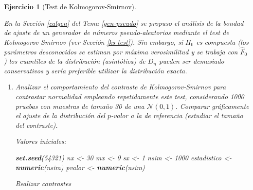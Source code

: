 \documentclass[
  spanish,
  10pt,
]{book}
\newenvironment{Shaded}{\begin{snugshade}}{\end{snugshade}}
\newcommand{\ControlFlowTok}[1]{\textcolor[rgb]{0.13,0.29,0.53}{\textbf{#1}}}
\newcommand{\DecValTok}[1]{\textcolor[rgb]{0.00,0.00,0.81}{#1}}
\newcommand{\FunctionTok}[1]{\textcolor[rgb]{0.13,0.29,0.53}{\textbf{#1}}}
\newcommand{\NormalTok}[1]{#1}
\newcommand{\OtherTok}[1]{\textcolor[rgb]{0.56,0.35,0.01}{#1}}
\newcommand{\SpecialCharTok}[1]{\textcolor[rgb]{0.81,0.36,0.00}{\textbf{#1}}}
\newcommand{\StringTok}[1]{\textcolor[rgb]{0.31,0.60,0.02}{#1}}
\theoremstyle{break}
\newtheorem{exercise}{Ejercicio}[chapter]
\theoremstyle{nonumberplain}
\begin{document}
\begin{exercise}[Test de Kolmogorov-Smirnov]
\protect\hypertarget{exr:ks-test-sim}{}\label{exr:ks-test-sim}

En la Sección \ref{calgen} del Tema \ref{gen-pseudo} se propuso el análisis de la bondad de ajuste de un generador de números pseudo-aleatorios mediante el test de Kolmogorov-Smirnov (ver Sección \ref{ks-test}).
Sin embargo, si \(H_{0}\) es compuesta (los parámetros desconocidos se estiman por máxima verosimilitud y se trabaja con \(\hat{F}_{0}\)) los cuantiles de la distribución (asintótica) de \(D_{n}\) pueden ser demasiado conservativos y sería preferible utilizar la distribución exacta.

\begin{enumerate}
\def\labelenumi{\alph{enumi})}
\item
  Analizar el comportamiento del contraste de Kolmogorov-Smirnov
  para contrastar normalidad empleando repetidamente este test,
  considerando 1000 pruebas con muestras de tamaño 30 de
  una \(\mathcal{N}(0,1)\). Comparar gráficamente el ajuste
  de la distribución del \(p\)-valor a la de referencia
  (estudiar el tamaño del contraste).

  Valores iniciales:

\begin{Shaded}
\begin{Highlighting}[]
\FunctionTok{set.seed}\NormalTok{(}\DecValTok{54321}\NormalTok{)}
\NormalTok{nx }\OtherTok{\textless{}{-}} \DecValTok{30}
\NormalTok{mx }\OtherTok{\textless{}{-}} \DecValTok{0}
\NormalTok{sx }\OtherTok{\textless{}{-}} \DecValTok{1}
\NormalTok{nsim }\OtherTok{\textless{}{-}} \DecValTok{1000}
\NormalTok{estadistico }\OtherTok{\textless{}{-}} \FunctionTok{numeric}\NormalTok{(nsim)}
\NormalTok{pvalor }\OtherTok{\textless{}{-}} \FunctionTok{numeric}\NormalTok{(nsim)}
\end{Highlighting}
\end{Shaded}

  Realizar contrastes

\begin{Shaded}
\end{Shaded}


\end{enumerate}
\end{exercise}
\end{document}

